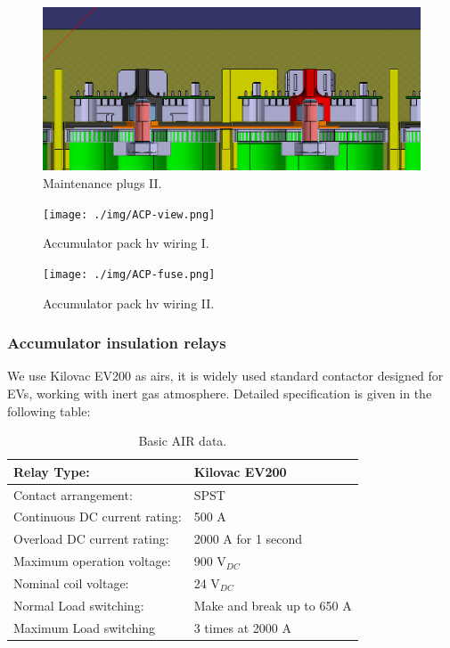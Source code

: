 \begin{figure}[H]
	\centering
	\includegraphics[width=\textwidth]{./img/ACP-nut2.png}
	\caption{Maintenance plugs II.}
	\label{fig:acp-maintance-plug2}
\end{figure}

\begin{figure}[H]
	\centering
	\texttt{[image: ./img/ACP-view.png]}
	\caption{Accumulator pack \gls{hv} wiring I.}
	\label{fig:acp-hv-wiring}
\end{figure}

\begin{figure}[H]
	\centering
	\texttt{[image: ./img/ACP-fuse.png]}
	\caption{Accumulator pack \gls{hv} wiring II.}
	\label{fig:acp-hv-wiring2}
\end{figure}

\subsubsection{Accumulator insulation relays}\label{subsec:airs}

We use Kilovac EV200 as \glspl{air}, it is widely used standard contactor designed for EVs, working with inert gas atmosphere. Detailed specification is given in the following table:

\begin{table}[H]
	\centering
	\caption{Basic AIR data.}
	\begin{tabu}{|X|X|}
		\hline
		Relay Type: & Kilovac EV200 \\
		\hline
		Contact arrangement: & SPST \\
		\hline
		Continuous DC current rating: & 500 A \\
		\hline
		Overload DC current rating:  & 2000 A for 1 second \\
		\hline
		Maximum operation voltage: & 900 V$_{DC}$ \\
		\hline
		Nominal coil voltage: & 24 V$_{DC}$ \\
		\hline
		Normal Load switching: & Make and break up to 650 A \\
		\hline
		Maximum Load switching & 3 times at 2000 A \\
		\hline
	\end{tabu}%
	\label{tab:acc-air}%
\end{table}%

